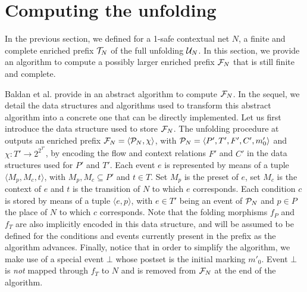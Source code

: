 \documentclass[11pt,a4paper]{article}
\begin{document}
\section{Computing the unfolding}
\label{sec:computing.unfolding}

In the previous section, we defined for a 1-safe contextual net $N$, a finite
and complete enriched prefix $\mathcal{T}_{N}$ of the full unfolding $\mathcal{U}_{N}$.  In
this section, we provide an algorithm to compute a possibly larger enriched
prefix $\mathcal{F}_{N}$ that is still finite and complete.

Baldan et al. provide in  an abstract algorithm to compute $\mathcal{F}_{N}$.  In the sequel, we detail the data structures and algorithms used to
transform this abstract algorithm into a concrete one that can be directly
implemented.  Let us first introduce the data structure used to store $\mathcal{F}_{N}$.
The unfolding procedure at  outputs an enriched
prefix $\mathcal{F}_{N} = \langle \mathcal{P}_{N}, \chi \rangle$, with $\mathcal{P}_{N} = \langle P',
T', F', C', m'_0 \rangle$ and $\chi : T' \to 2^{2^{T'}}$, by encoding the flow
and context relations $F'$ and $C'$ in the data structures used for $P'$ and
$T'$.  Each event $e$ is represented by means of a tuple $\langle M_p, M_c, t
\rangle$, with $M_p, M_c \subseteq P'$ and $t \in T$.  Set $M_p$ is the preset
of $e$, set $M_c$ is the context of $e$ and $t$ is the transition of $N$ to
which $e$ corresponds.  Each condition $c$ is stored by means of a tuple
$\langle e, p \rangle$, with $e \in T'$ being an event of $\mathcal{P}_{N}$ and $p \in
P$ the place of $N$ to which $c$ corresponds.  Note that the folding morphisms
$f_P$ and $f_T$ are also implicitly encoded in this data structure, and will be
assumed to be defined for the conditions and events currently present in the
prefix as the algorithm advances.  Finally, notice that in order to simplify
the algorithm, we make use of a special event $\bot$ whose postset is the
initial marking $m'_0$.  Event $\bot$ is \emph{not} mapped through $f_T$ to $N$
and is removed from $\mathcal{F}_{N}$ at the end of the algorithm.
\end{document}
